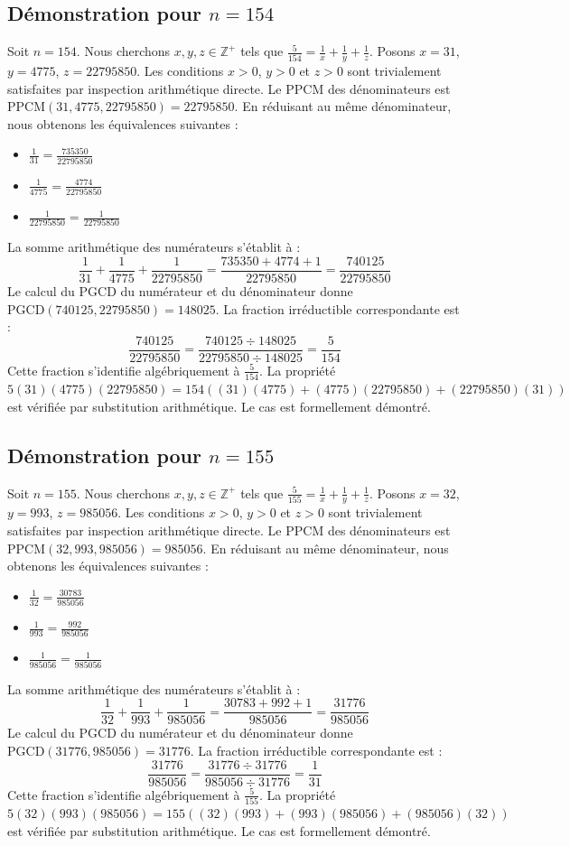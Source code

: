 \documentclass[12pt,a4paper]{article}
\begin{document}
\subsection{Démonstration pour $n = 154$}
Soit $n = 154$. Nous cherchons $x, y, z \in \mathbb{Z}^{+}$ tels que $\frac{5}{154} = \frac{1}{x} + \frac{1}{y} + \frac{1}{z}$.
Posons $x = 31$, $y = 4775$, $z = 22795850$.
Les conditions $x > 0$, $y > 0$ et $z > 0$ sont trivialement satisfaites par inspection arithmétique directe.
Le PPCM des dénominateurs est $\text{PPCM}(31, 4775, 22795850) = 22795850$.
En réduisant au même dénominateur, nous obtenons les équivalences suivantes :
\begin{itemize}
    \item $\frac{1}{31} = \frac{735350}{22795850}$
    \item $\frac{1}{4775} = \frac{4774}{22795850}$
    \item $\frac{1}{22795850} = \frac{1}{22795850}$
\end{itemize}
La somme arithmétique des numérateurs s'établit à :
$$ \frac{1}{31} + \frac{1}{4775} + \frac{1}{22795850} = \frac{735350 + 4774 + 1}{22795850} = \frac{740125}{22795850} $$
Le calcul du PGCD du numérateur et du dénominateur donne $\text{PGCD}(740125, 22795850) = 148025$.
La fraction irréductible correspondante est :
$$ \frac{740125}{22795850} = \frac{740125 \div 148025}{22795850 \div 148025} = \frac{5}{154} $$
Cette fraction s'identifie algébriquement à $\frac{5}{154}$.
La propriété $5(31)(4775)(22795850) = 154((31)(4775) + (4775)(22795850) + (22795850)(31))$ est vérifiée par substitution arithmétique.
Le cas est formellement démontré.

\subsection{Démonstration pour $n = 155$}
Soit $n = 155$. Nous cherchons $x, y, z \in \mathbb{Z}^{+}$ tels que $\frac{5}{155} = \frac{1}{x} + \frac{1}{y} + \frac{1}{z}$.
Posons $x = 32$, $y = 993$, $z = 985056$.
Les conditions $x > 0$, $y > 0$ et $z > 0$ sont trivialement satisfaites par inspection arithmétique directe.
Le PPCM des dénominateurs est $\text{PPCM}(32, 993, 985056) = 985056$.
En réduisant au même dénominateur, nous obtenons les équivalences suivantes :
\begin{itemize}
    \item $\frac{1}{32} = \frac{30783}{985056}$
    \item $\frac{1}{993} = \frac{992}{985056}$
    \item $\frac{1}{985056} = \frac{1}{985056}$
\end{itemize}
La somme arithmétique des numérateurs s'établit à :
$$ \frac{1}{32} + \frac{1}{993} + \frac{1}{985056} = \frac{30783 + 992 + 1}{985056} = \frac{31776}{985056} $$
Le calcul du PGCD du numérateur et du dénominateur donne $\text{PGCD}(31776, 985056) = 31776$.
La fraction irréductible correspondante est :
$$ \frac{31776}{985056} = \frac{31776 \div 31776}{985056 \div 31776} = \frac{1}{31} $$
Cette fraction s'identifie algébriquement à $\frac{5}{155}$.
La propriété $5(32)(993)(985056) = 155((32)(993) + (993)(985056) + (985056)(32))$ est vérifiée par substitution arithmétique.
Le cas est formellement démontré.
\end{document}
